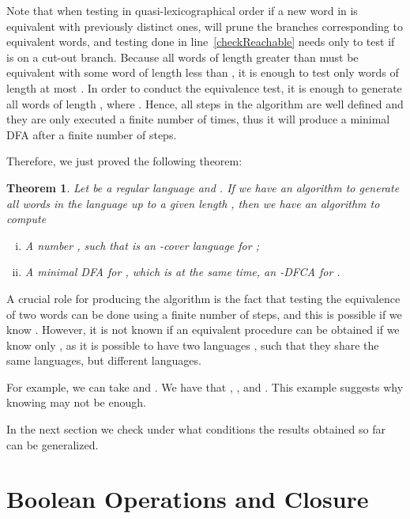 \documentclass{article}
\newtheorem{theorem}{Theorem}
\begin{document}
Note that when testing in quasi-lexicographical order if a new 
word in  is equivalent with previously distinct ones, 
will prune the branches corresponding to  equivalent words,
 and testing done in line~\ref{checkReachable} needs only to test if  
is on a cut-out branch.
Because all words of length greater than   must be equivalent
with some word of length less than , it is enough to test only words
of length at most . In order to conduct the equivalence 
test, it is enough to generate  all words of length , where . Hence, all steps in the algorithm are well defined and they are only executed 
a finite number of times, thus it will produce a minimal DFA after a finite number of steps.



Therefore, we just proved the following theorem:
\begin{theorem}
 Let  be a regular language and . 
If we have an algorithm to generate all words in the language  up to a given length , 
then we have an algorithm to compute
\begin{enumerate}[i)]
  \item A number , such that  is an -cover language for ;
  \item A minimal DFA  for , which is at the same time, an -DFCA for .
\end{enumerate}
\end{theorem}


A crucial role for producing the algorithm is the fact that testing the equivalence of two words
can be done using a finite number of steps, and this is possible if we know .
However, it is not known if an equivalent procedure can be obtained if we know only , 
as it is possible to have two languages ,
such that they share the same  languages, but different   languages.

For example, we can take 
and .
We have that 
, , 
and .
This example suggests why knowing  may not be enough.





In the next section we check under what conditions the results obtained 
so far can be generalized.

\section{Boolean Operations and Closure}
\label{sec:sufclosuregeneral}
\end{document}
